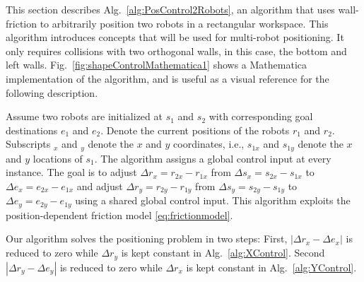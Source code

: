 \begin{figure*}
\caption{\label{fig:shapeControlMathematica1}{Frames from an implementation of Alg.\ \ref{alg:PosControl2Robots}: two robot positioning using walls with infinite friction. The algorithm only requires friction along the bottom and left walls.
Robot initial positions are shown by a crosshair, and final positions by a circled crosshair.  Dashed lines show the shortest route if robots could be controlled independently.  The path given by  Alg.\ \ref{alg:PosControl2Robots} is shown with solid arrows.
The bottom row shows an extreme case where the robots must switch position.
}
}
\end{figure*}

This section describes Alg.~\ref{alg:PosControl2Robots}, an algorithm that uses wall-friction to arbitrarily position two robots in a rectangular workspace.  This algorithm  introduces concepts that will be used for multi-robot positioning. It only requires collisions with two orthogonal walls, in this case, the bottom and left walls. Fig.~\ref{fig:shapeControlMathematica1} shows a Mathematica implementation of the algorithm, and is useful as a visual reference for the following description.

Assume two robots are initialized at $s_1$ and $s_2$ with corresponding goal destinations $e_1$ and $e_2$. 
Denote the current positions of the robots  $r_1$ and $r_2$. 
Subscripts $_x$ and $_y$ denote the $x$ and $y$ coordinates, i.e., $s_{1x}$ and $s_{1y}$ denote the $x$ and $y$ locations of $s_1$. 
The algorithm assigns a global control input at every instance.
The goal is to adjust 
 $\Delta r_x = r_{2x}-r_{1x}$ from $\Delta s_x = s_{2x}-s_{1x}$ to $\Delta e_x = e_{2x}-e_{1x}$ and  adjust 
 $\Delta r_y = r_{2y}-r_{1y}$ from $\Delta s_y = s_{2y}-s_{1y}$ to $\Delta e_y = e_{2y}-e_{1y}$ using a shared global control input. 
 This algorithm exploits the position-dependent friction model \eqref{eq:frictionmodel}.

Our algorithm solves the positioning problem in two steps: 
First, $|\Delta r_x - \Delta e_x |$ is reduced to zero while  $\Delta r_y$ is kept constant in Alg.~\ref{alg:XControl}. 
Second $|\Delta r_y - \Delta e_y |$ is reduced to zero while  $\Delta r_x$ is kept constant in Alg.~\ref{alg:YControl}. 

